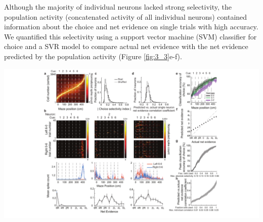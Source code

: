 Although the majority of individual neurons lacked strong selectivity, the population activity (concatenated activity of all individual neurons) contained information about the choice and net evidence on single trials with high accuracy. We quantified this selectivity using a support vector machine (SVM) classifier for choice and a SVR model to compare actual net evidence with the net evidence predicted by the population activity (Figure \ref{fig:3_3}e-f). 

\begin{FPfigure}
\includegraphics[width=1.5\textwidth,center]{figures/fig_3_3.pdf}
\caption[Distributed representation of task-relevant information across PPC neurons.]
{\textbf{Distributed representation of task-relevant information across PPC neurons. a,} Normalized mean activity across all trials for all neurons pooled across all datasets (n = 3840 cells from 5 mice). Traces were normalized to the peak of each cell's activity, averaged, and sorted by the peak's maze position. 
%
\textbf{b,} Single trial activity on left 6-0 and right 0-6 trials for three example neurons. Top panels: each row is an individual trial. Bottom panels: mean $\pm$ s.e.m. For each net evidence condition (e.g., 2L), the mean spike count was calculated by combining the activity at all cue epochs matching the given net evidence. 
%
\textbf{c,} Histogram of the the choice selectivity index for individual neurons (black) and with shuffled trial labels (gray). Choice selectivity was calculated separately for each spatial bin, and the maximum magnitude across bins was taken for each neuron. Choice selectivity for each neuron was calculated based on activity in left 6-0 and right 0-6 trials (Methods \ref{methods:choice_sel}).
%
\textbf{d,} Histogram of SVR model performance using all trial types, quantified as the correlation between the actual net evidence and the net evidence predicted by the SVR model, for individual neurons (black) and with shuffled net evidence labels (gray).
}
\end{FPfigure}
